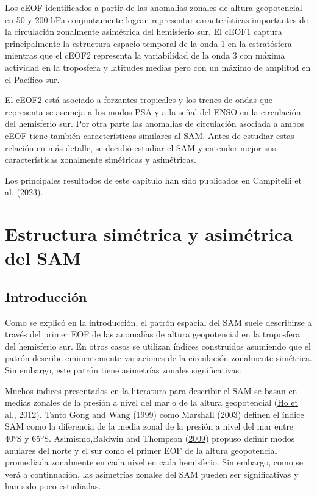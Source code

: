 \documentclass[12pt,oneside,a4paper]{reedthesis}
\begin{document}
Los cEOF identificados a partir de las anomalias zonales de altura geopotencial en 50 y 200 hPa conjuntamente logran representar características importantes de la circulación zonalmente asimétrica del hemisferio sur.
El cEOF1 captura principalmente la estructura espacio-temporal de la onda 1 en la estratósfera mientras que el cEOF2 representa la variabilidad de la onda 3 con máxima actividad en la troposfera y latitudes medias pero con un máximo de amplitud en el Pacífico sur.

El cEOF2 está asociado a forzantes tropicales y los trenes de ondas que representa se asemeja a los modos PSA y a la señal del ENSO en la circulación del hemisferio sur.
Por otra parte las anomalías de circulación asociada a ambos cEOF tiene también características similares al SAM.
Antes de estudiar estas relación en más detalle, se decidió estudiar el SAM y entender mejor sus características zonalmente simétricas y asimétricas.

Los principales resultados de este capítulo han sido publicados en Campitelli et al. (\protect\hyperlink{ref-campitelli2023}{2023}).

\hypertarget{asymsam}{%
\chapter{Estructura simétrica y asimétrica del SAM}\label{asymsam}}

\hypertarget{introducciuxf3n-1}{%
\section{Introducción}\label{introducciuxf3n-1}}

Como se explicó en la introducción, el patrón espacial del SAM suele describirse a través del primer EOF de las anomalías de altura geopotencial en la troposfera del hemisferio sur.
En otros casos se utilizan índices construidos asumiendo que el patrón describe eminentemente variaciones de la circulación zonalmente simétrica.
Sin embargo, este patrón tiene asimetrías zonales significativas.

Muchos índices presentados en la literatura para describir el SAM se basan en medias zonales de la presión a nivel del mar o de la altura geopotencial (\protect\hyperlink{ref-ho2012}{Ho et al., 2012}).
Tanto Gong and Wang (\protect\hyperlink{ref-gong1999}{1999}) como Marshall (\protect\hyperlink{ref-marshall2003}{2003}) definen el índice SAM como la diferencia de la media zonal de la presión a nivel del mar entre 40ºS y 65ºS.
Asimismo,Baldwin and Thompson (\protect\hyperlink{ref-baldwin2009}{2009}) propuso definir modos anulares del norte y el sur como el primer EOF de la altura geopotencial promediada zonalmente en cada nivel en cada hemisferio.
Sin embargo, como se verá a continuación, las asimetrías zonales del SAM pueden ser significativas y han sido poco estudiadas.
\end{document}
